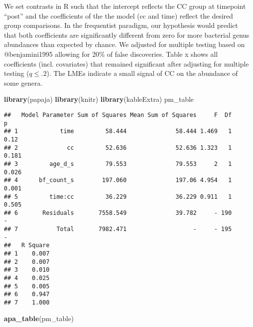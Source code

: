 \documentclass[]{article}
\newenvironment{Shaded}{\begin{snugshade}}{\end{snugshade}}
\newcommand{\KeywordTok}[1]{\textcolor[rgb]{0.13,0.29,0.53}{\textbf{#1}}}
\newcommand{\NormalTok}[1]{#1}
\begin{document}
We set contrasts in R such that the intercept reflects the CC group at
timepoint ``post'' and the coefficients of the the model (cc and time)
reflect the desired group comparisons. In the frequentist paradigm, our
hypothesis would predict that both coefficients are significantly
different from zero for more bacterial genus abundances than expected by
chance. We adjusted for multiple testing based on @benjamini1995
allowing for 20\% of false discoveries. Table x shows all coefficients
(incl. covariates) that remained significant after adjusting for
multiple testing (\(q\leq.2\)). The LMEs indicate a small signal of CC
on the abundance of some genera.

\begin{Shaded}
\begin{Highlighting}[]
\KeywordTok{library}\NormalTok{(papaja)}
\KeywordTok{library}\NormalTok{(knitr)}
\KeywordTok{library}\NormalTok{(kableExtra)}
\NormalTok{pm_table}
\end{Highlighting}
\end{Shaded}

\begin{verbatim}
##   Model Parameter Sum of Squares Mean Sum of Squares     F  Df     p
## 1            time         58.444              58.444 1.469   1  0.12
## 2              cc         52.636              52.636 1.323   1 0.181
## 3         age_d_s         79.553              79.553     2   1 0.026
## 4      bf_count_s        197.060              197.06 4.954   1 0.001
## 5         time:cc         36.229              36.229 0.911   1 0.505
## 6       Residuals       7558.549              39.782     - 190     -
## 7           Total       7982.471                   -     - 195     -
##   R Square
## 1    0.007
## 2    0.007
## 3    0.010
## 4    0.025
## 5    0.005
## 6    0.947
## 7    1.000
\end{verbatim}

\begin{Shaded}
\begin{Highlighting}[]
\KeywordTok{apa_table}\NormalTok{(pm_table)}
\end{Highlighting}
\end{Shaded}
\end{document}
